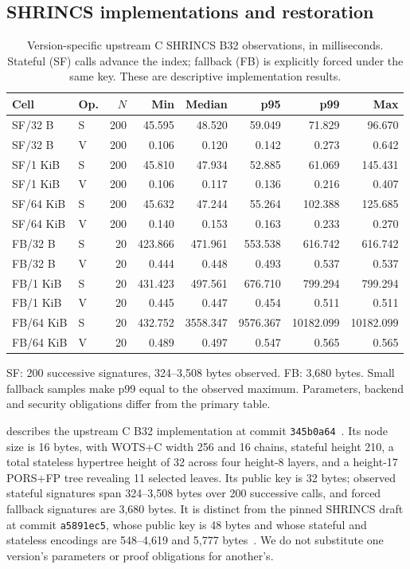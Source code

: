 \subsection{SHRINCS implementations and restoration}
\begin{table}[t]
\caption{Version-specific upstream C SHRINCS B32 observations, in milliseconds. Stateful (SF) calls advance the index; fallback (FB) is explicitly forced under the same key. These are descriptive implementation results.}\label{tab:comparison-b32}
\centering\small\setlength{\tabcolsep}{3pt}
\begin{tabular}{llrrrrrr}\toprule
Cell & Op. & $N$ & Min & Median & p95 & p99 & Max\\\midrule
SF/32 B & S & 200 & 45.595 & 48.520 & 59.049 & 71.829 & 96.670\\
SF/32 B & V & 200 & 0.106 & 0.120 & 0.142 & 0.273 & 0.642\\
SF/1 KiB & S & 200 & 45.810 & 47.934 & 52.885 & 61.069 & 145.431\\
SF/1 KiB & V & 200 & 0.106 & 0.117 & 0.136 & 0.216 & 0.407\\
SF/64 KiB & S & 200 & 45.632 & 47.244 & 55.264 & 102.388 & 125.685\\
SF/64 KiB & V & 200 & 0.140 & 0.153 & 0.163 & 0.233 & 0.270\\
FB/32 B & S & 20 & 423.866 & 471.961 & 553.538 & 616.742 & 616.742\\
FB/32 B & V & 20 & 0.444 & 0.448 & 0.493 & 0.537 & 0.537\\
FB/1 KiB & S & 20 & 431.423 & 497.561 & 676.710 & 799.294 & 799.294\\
FB/1 KiB & V & 20 & 0.445 & 0.447 & 0.454 & 0.511 & 0.511\\
FB/64 KiB & S & 20 & 432.752 & 3558.347 & 9576.367 & 10182.099 & 10182.099\\
FB/64 KiB & V & 20 & 0.489 & 0.497 & 0.547 & 0.565 & 0.565\\
\bottomrule\end{tabular}
\smallskip\par\raggedright\footnotesize SF: 200 successive signatures, 324--3,508 bytes observed. FB: 3,680 bytes. Small fallback samples make p99 equal to the observed maximum. Parameters, backend and security obligations differ from the primary table.
\end{table}
 describes the upstream C B32 implementation at commit \texttt{345b0a64}~\cite{shrincsc}. Its node size is 16 bytes, with WOTS+C width 256 and 16 chains, stateful height 210, a total stateless hypertree height of 32 across four height-8 layers, and a height-17 PORS+FP tree revealing 11 selected leaves. Its public key is 32 bytes; observed stateful signatures span 324--3,508 bytes over 200 successive calls, and forced fallback signatures are 3,680 bytes. It is distinct from the pinned SHRINCS draft at commit \texttt{a5891ec5}, whose public key is 48 bytes and whose stateful and stateless encodings are 548--4,619 and 5,777 bytes~\cite{shrincsdraft}. We do not substitute one version's parameters or proof obligations for another's.

